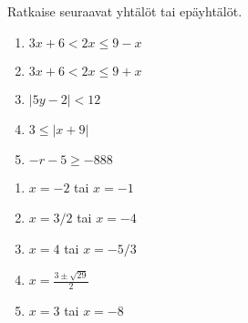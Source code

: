 \begin{tehtava}
    Ratkaise seuraavat yhtälöt tai epäyhtälöt.
    \begin{enumerate}
        \item $3x+6<2x\leq 9-x$
        \item $3x+6<2x\leq 9+x$
        \item $|5y-2|<12$
        \item $3\leq |x+9|$
        \item $-r-5\geq-888$
    \end{enumerate}
    \begin{vastaus}
        \begin{enumerate}
            \item $x=-2$ tai $x=-1$
            \item $x=3/2$ tai $x=-4$
            \item $x=4$ tai $x=-5/3$
            \item $x=\frac{3\pm\sqrt{29}}{2}$
            \item $x=3$ tai $x=-8$
        \end{enumerate}
    \end{vastaus}
\end{tehtava}